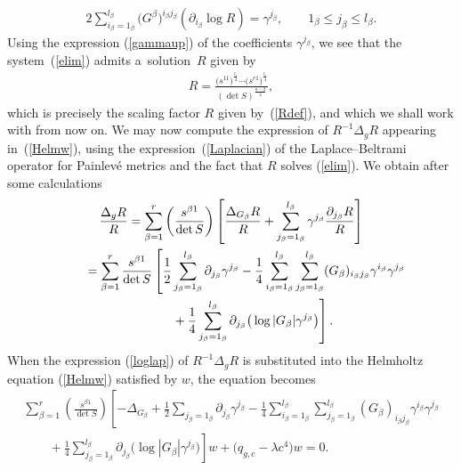 \documentclass[pdftex]{sigma}
\numberwithin{equation}{section}
\newcommand{\jbeta}{j_{\beta}}
\newcommand{\lbeta}{l_{\beta}}
\newcommand{\ibeta}{i_{\beta}}
\begin{document}
\begin{gather}\label{elim}
2\sum_{\ibeta = 1_{\beta}}^{\lbeta}\big(G^{\beta}\big)^{\ibeta \jbeta}(\partial_{\ibeta}\log R)=\gamma^{\jbeta},\qquad 1_{\beta}\leq \jbeta \leq \lbeta .
\end{gather}
Using the expression (\ref{gammaup}) of the coefficients $\gamma^{\jbeta}$, we see that the system~(\ref{elim}) admits a~so\-lu\-tion~$R$ given by
\begin{gather*}%
R=\frac{\big(s^{11}\big)^\frac{l_1}{4} \cdots \big(s^{r1}\big)^{\frac{l_r}{4}}}{(\det S)^{\frac{n-2}{4}}},
\end{gather*}
which is precisely the scaling factor $R$ given by~(\ref{Rdef}), and which we shall work with from now on. We may now compute the expression of $R^{-1} \Delta_{g}R$ appearing in~(\ref{Helmw}), using the expression~(\ref{Laplacian}) of the Laplace--Beltrami operator for Painlev\'e metrics and the fact that $R$ solves (\ref{elim}). We obtain after some calculations
\begin{gather}
\frac{\Delta_{g}R}{R}=\sum_{\beta=1}^{r}\left(\frac{s^{\beta 1}}{\det S}\right)\left[\frac{\Delta_{G_{\beta}}R}{R}+\sum_{\jbeta =1_{\beta}}^{\lbeta}\gamma^{\jbeta}\frac{\partial_{\jbeta}R}{R}\right]\nonumber\\
\hphantom{\frac{\Delta_{g}R}{R}}{}=\sum_{\beta=1}^{r}\frac{s^{\beta 1}}{\det S}\left[\frac{1}{2}\sum_{\jbeta =1_{\beta}}^{\lbeta}\partial_{\jbeta}\gamma^{\jbeta}-\frac{1}{4}\sum_{\ibeta = 1_{\beta}}^{\lbeta}\sum_{\jbeta = 1_{\beta}}^{\lbeta}(G_{\beta})_{\ibeta \jbeta}\gamma^{\ibeta}\gamma^{\jbeta}\right.\nonumber\\
\left.\hphantom{\frac{\Delta_{g}R}{R}=}{}+\frac{1}{4}\sum_{\jbeta =1_{\beta}}^{\lbeta}\partial_{\jbeta}\big(\log|G_{\beta}|\gamma^{\jbeta}\big)\right].\label{loglap}
\end{gather}
When the expression (\ref{loglap}) of $R^{-1} \Delta_{g}R$ is substituted into the Helmholtz equation (\ref{Helmw}) satisfied by $w$, the equation becomes
\begin{gather}
\sum_{\beta=1}^{r}\left(\frac{s^{\beta 1}}{\det S}\right)\left[-\Delta_{G_{\beta}}+\frac{1}{2}\sum_{\jbeta = 1_{\beta}}\partial_{\jbeta}\gamma^{\jbeta} -\frac{1}{4}\sum_{\ibeta = 1_{\beta}}^{\lbeta}\sum_{\jbeta = 1_{\beta}}^{\lbeta}(G_{\beta})_{\ibeta \jbeta}\gamma^{\ibeta}\gamma^{\jbeta}\right.\nonumber\\
\left.\qquad{} +\frac{1}{4}\sum_{\jbeta =1_{\beta}}^{\lbeta}\partial_{\jbeta}\big(\log|G_{\beta}|\gamma^{\jbeta}\big)\right]w+\big(q_{g,c}-\lambda c^{4}\big)w=0.\label{Helmwmod}
\end{gather}
\end{document}
